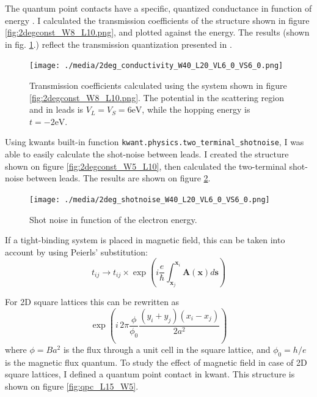 \documentclass[11pt, a4paper, twocolumn]{article}
\begin{document}
The quantum point contacts have a specific, quantized conductance in function of energy \cite{QPCarticle}.
I calculated the transmission coefficients of the structure shown in figure \ref{fig:2degconst_W8_L10.png},
and plotted against the energy. The results (shown in fig. \ref{fig:2deg_conductivity_W40_L20_VL6_0_VS6_0.png}.)
reflect the transmission quantization presented in \cite{QPCarticle}.
\begin{figure}[H]
  \begin{center}
  \texttt{[image: ./media/2deg\_conductivity\_W40\_L20\_VL6\_0\_VS6\_0.png]}
  \caption{Transmission coefficients calculated using the system shown in figure \ref{fig:2degconst_W8_L10.png}.
  The potential in the scattering region and in leads is $V_L=V_S=6\textrm{eV}$, while the
  hopping energy is $t=-2\textrm{eV}$.}
  \label{fig:2deg_conductivity_W40_L20_VL6_0_VS6_0.png}
  \end{center}
\end{figure}

Using kwants built-in function \texttt{kwant.physics.two\_terminal\_shotnoise},
I was able to easily calculate the shot-noise \cite{shotnoise} between leads. 
I created the structure shown on figure \ref{fig:2degconst_W5_L10}, then calculated
the two-terminal shot-noise between leads. The results are shown on figure \ref{fig:2deg_shotnoise_W40_L20_VL6_0_VS6_0}.
\begin{figure}[H]
  \begin{center}
  \texttt{[image: ./media/2deg\_shotnoise\_W40\_L20\_VL6\_0\_VS6\_0.png]}
  \caption{Shot noise in function of the electron energy.}
  \label{fig:2deg_shotnoise_W40_L20_VL6_0_VS6_0}
  \end{center}
\end{figure}
If a tight-binding system is placed in magnetic field, this can be taken into account by using Peierls' substitution:
\begin{equation*}
  t_{ij} \rightarrow t_{ij} \times \exp\left(i \frac{e}{\hbar} \int_{\mathbf{x}_j}^{\mathbf{x}_i} \mathbf{A}(\mathbf{x}) d\mathbf{s}\right)
\end{equation*}

For 2D square lattices this can be rewritten as 
\begin{equation*}
  \exp\left(i\, 2 \pi \frac{\phi}{\phi_0} \frac{(y_i + y_j)(x_i-x_j)}{2a^2} \right)  
\end{equation*}
where $\phi = B a^2$ is the flux through a unit cell in the square lattice,
and $\phi_0 = h/e$ is the magnetic flux quantum. To study the effect of magnetic field in case of 
2D square lattices, I defined a quantum point contact in kwant. This structure is shown on figure
\ref{fig:qpc_L15_W5}.
\end{document}
